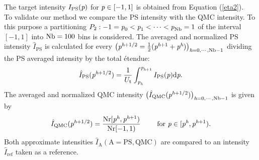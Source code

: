 The target intensity $I_{\textrm{PS}}(\textit{p})$ for $\textit{p}\in[-1,1]$ is obtained from Equation (\ref{eta2}). \\ \indent
To validate our method we compare the PS intensity with the QMC intensity. 
To this purpose a partitioning $P_2:-1=\textit{p}_{0}<\textit{p}_1<\cdots<\textit{p}_{\textrm{Nb}}=1$ of the interval $[-1,1]$ into $\textrm{Nb}=100$ bins is considered. 
The averaged and normalized PS intensity $\hat{I}_{\textrm{PS}}$ is calculated for every 
$\big(\textit{p}^{\textit{h}+1/2} = \frac{1}{2}(\textit{p}^{\textit{h}+1}+ \textit{p}^{\textit{h}})\big)_{\textit{h}=0, \cdots, \textrm{Nb}-1}$ dividing the PS averaged intensity by the total \'{e}tendue:
\begin{equation}\label{eq:normalized_PS_intensity}
\hat{I}_{\textrm{PS}}(\textit{p}^{\textit{h}+1/2}) = \frac{1}{U_{\textrm{t}}}\int_{\textit{p}_{\textit{h}}}^{\textit{p}_{\textit{h}+1}} I_{\textrm{PS}}(\textit{p})\textrm{d}\textit{p}.
\end{equation}
The averaged and normalized QMC intensity $\big(\hat{I}_{\textrm{QMC}}(\textit{p}^{\textit{h}+1/2})\big)_{\textit{h} = 0, \cdots, \textrm{Nb}-1}$ is given by
\begin{equation}\label{eq:normalized_MC_intensity}
\hat{I}_{\textrm{QMC}}(\textit{p}^{\textit{h}+1/2}) = \frac{\textrm{Nr}[\textit{p}^{\textit{h}},\textit{p}^{\textit{h}+1})}{\textrm{Nr}[-1,1)} 
\qquad \mbox{ for } \textit{p}\in[\textit{p}^{\textit{h}}, \textit{p}^{\textit{h}+1}).
\end{equation} 
Both approximate intensities $\hat{I}_{\textrm{A}} (\textrm{A} = \textrm{PS}, \textrm{QMC})$ are compared to an intensity $\hat{I}_{\textrm{ref}}$ taken as a reference. 

